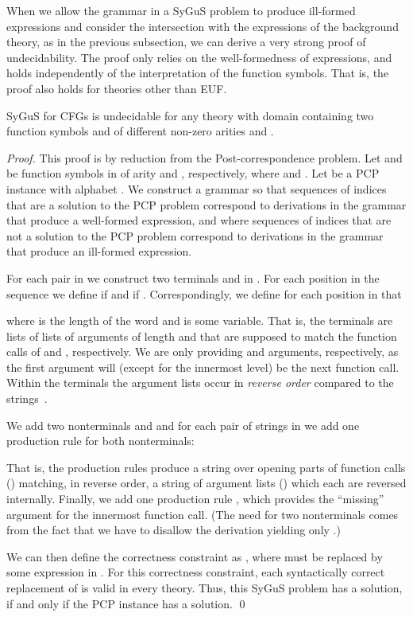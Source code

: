 When we allow the grammar in a SyGuS problem to produce ill-formed expressions and consider the intersection with the expressions of the background theory, as in the previous subsection, we can derive a very strong proof of undecidability. 
The proof only relies on the well-formedness of expressions, and holds independently of the interpretation of the function symbols.
That is, the proof also holds for theories other than EUF. 



\begin{theorem}
SyGuS for CFGs is undecidable for any theory  with domain  containing 
two function symbols  and  of different non-zero arities  and . 
\end{theorem}

\begin{proof}
This proof is by reduction from the Post-correspondence problem.
Let  and  be function symbols in  of arity  and , respectively, where  and .
Let  be a PCP instance with alphabet . 
We construct a grammar  so that sequences of indices that are a solution to the PCP problem correspond to derivations in the grammar that produce a well-formed expression, and where sequences of indices that are not a solution to the PCP problem correspond to derivations in the grammar that produce an ill-formed expression. 

For each pair  in  we construct two terminals  and  in . 
For each position  in the sequence  we define  if  and  if . 
Correspondingly, we define for each position  in  that 


where  is the length of the word  and  is some variable.
That is, the terminals  are lists of lists of arguments of length  and  that are supposed to match the function calls of  and , respectively. 
We are only providing  and  arguments, respectively, as the first argument will (except for the innermost level) be the next function call.
Within the terminals  the argument lists occur in \emph{reverse order} compared to the strings~. 

We add two nonterminals  and  and for each pair of strings  in  we add one production rule for both nonterminals:

That is, the production rules produce a string over opening parts of function calls () matching, in reverse order, a string of argument lists () which each are reversed internally. 
Finally, we add one production rule , which provides the ``missing'' argument for the innermost function call. 
(The need for two nonterminals comes from the fact that we have to disallow the derivation yielding only .)

We can then define the correctness constraint  as , where  must be replaced by some expression in . 
For this correctness constraint, each syntactically correct replacement of  is valid in every theory. 
Thus, this SyGuS problem has a solution, if and only if the PCP instance  has a solution. 
\qed
\end{proof}

